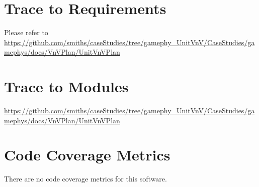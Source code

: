 \documentclass[12pt, titlepage]{article}
\begin{document}
\section{Trace to Requirements}
Please refer to \url{https://github.com/smiths/caseStudies/tree/gamephy_UnitVnV/CaseStudies/gamephys/docs/VnVPlan/UnitVnVPlan}		
\section{Trace to Modules}		
\url{https://github.com/smiths/caseStudies/tree/gamephy_UnitVnV/CaseStudies/gamephys/docs/VnVPlan/UnitVnVPlan}	
\section{Code Coverage Metrics}
There are no code coverage metrics for this software.



\end{document}
